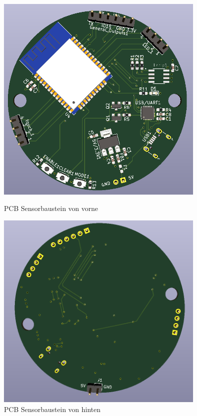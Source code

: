 \begin{figure}[htb]
	\centering
	\begin{minipage}[t]{0.45\linewidth}
		\centering
	\includegraphics[width=0.90\textwidth]{graphics/pcb_sensor_vorne.png}
\caption{PCB Sensorbaustein von vorne}
\label{pic: pcb_sensor_vorne}
	\end{minipage}%
	\hfill
	\begin{minipage}[t]{0.45\linewidth}
		\centering
	\includegraphics[width=0.90\textwidth]{graphics/pcb_sensor_hinten.png}
\caption{PCB Sensorbaustein von hinten}
\label{pic: pcb_sensor_hinten}
	\end{minipage}
\end{figure}





